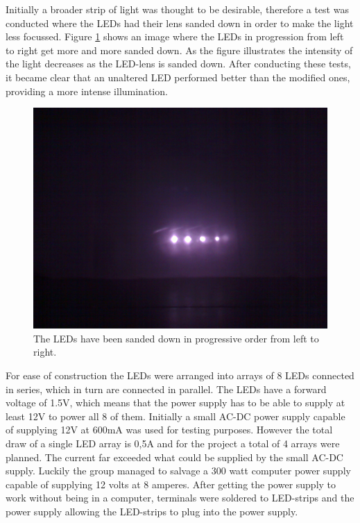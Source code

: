 Initially a broader strip of light was thought to be desirable, therefore a test was conducted where the LEDs had their lens sanded down in order to make the light less focussed. Figure \ref{fig:leds_sanded} shows an image where the LEDs in progression from left to right get more and more sanded down. As the figure illustrates the intensity of the light decreases as the LED-lens is sanded down. After conducting these tests,  it became clear that an unaltered LED performed better than the modified ones, providing a more intense illumination.

\begin{figure} [htbp]
\centering
\includegraphics[width=1.00\textwidth]{Pictures/Theory/sanded_leds.jpg}
\caption{The LEDs have been sanded down in progressive order from left to right.}
\label{fig:leds_sanded}
\end{figure}

For ease of construction the LEDs were arranged into arrays of 8 LEDs connected in series, which in turn are connected in parallel. The LEDs have a forward voltage of 1.5V, which means that the power supply has to be able to supply at least 12V to power all 8 of them. Initially a small AC-DC power supply capable of supplying 12V at 600mA was used for testing purposes. However the total draw of a single LED array is 0,5A and for the project a total of 4 arrays were planned. The current far exceeded what could be supplied by the small AC-DC supply. Luckily the group managed to salvage a 300 watt computer power supply capable of supplying 12 volts at 8 amperes. After getting the power supply to work without being in a computer, terminals were soldered to LED-strips and the power supply allowing the LED-strips to plug into the power supply.

